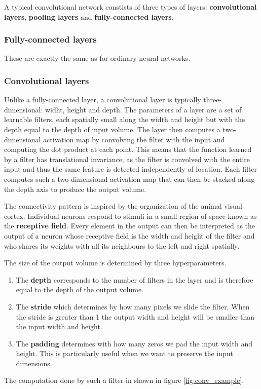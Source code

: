 \documentclass[12pt,a4paper,twoside,openright]{report}
\begin{document}
A typical convolutional network constists of three types of layers: \textbf{convolutional layers}, \textbf{pooling layers} and \textbf{fully-connected layers}. 
\subsubsection{Fully-connected layers}
These are exactly the same as for ordinary neural networks.

\subsubsection{Convolutional layers}
Unlike a fully-connected layer, a convolutional layer is typically three-dimensional: widht, height and depth. The parameters of a layer are a set of learnable filters, each spatially small along the width and height but with the depth equal to the depth of input volume. The layer then computes a two-dimensional activation map by convolving the filter with the input and computing the dot product at each point. This means that the function learned by a filter has translational invariance, as the filter is convolved with the entire input and thus the same feature is detected independently of location. Each filter computes such a two-dimensional activation map that can then be stacked along the depth axis to produce the output volume.

The connectivity pattern is inspired by the organization of the animal visual cortex. Individual neurons respond to stimuli in a small region of space known as the \textbf{receptive field}. Every element in the output can then be interpreted as the output of a neuron whose receptive field is the width and height of the filter and who shares its weights with all its neighbours to the left and right spatially.

The size of the output volume is determined by three hyperparameters.
\begin{enumerate}
	\item The \textbf{depth} corresponds to the number of filters in the layer and is therefore equal to the depth of the output volume.
	\item The \textbf{stride} which determines by how many pixels we slide the filter. When the stride is greater than 1 the output width and height will be smaller than the input width and height.
	\item The \textbf{padding} determines with how many zeros we pad the input width and height. This is particularly useful when we want to preserve the input dimensions.
\end{enumerate}
The computation done by such a filter in shown in figure \ref{fig:conv_example}.
\end{document}
